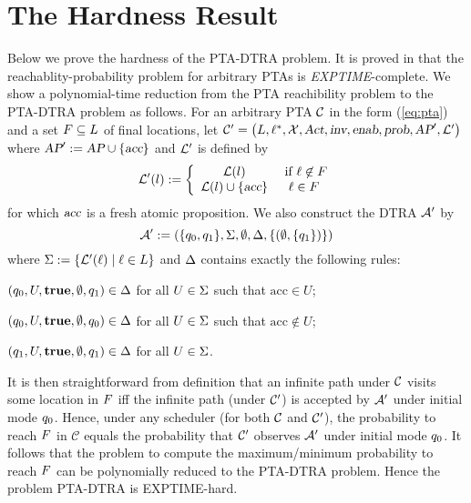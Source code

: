 \section{The Hardness Result}\label{app:hardness}

Below we prove the hardness of the PTA-DTRA problem. It is proved in \cite{LaroussinieS07} that the reachablity-probability problem for arbitrary PTAs is \emph{EXPTIME}-complete.
We show a polynomial-time reduction from the PTA reachibility problem to the PTA-DTRA problem as follows.
For an arbitrary PTA $\mathcal{C}$ in the form (\ref{eq:pta})
and a set $F\subseteq L$ of final locations,
let $\mathcal{C}'=\left(L, \ell^*, \mathcal{X}, \mbox{\sl Act}, \mbox{\sl inv}, \mbox{\sl enab},  \mbox{\sl prob}, \mbox{\sl AP}',\mathcal{L}'\right)$ where $\mbox{\sl AP}':=\mbox{\sl AP}\cup\{\mbox{\sl acc}\}$ and
$\mathcal{L}'$ is defined by
\begin{displaymath}
    \mathcal{L}'(l):=\left\{
    \begin{array}{cc}
        \mathcal{L}(l) & \mbox{ if } \ell\not\in F\\
        \mathcal{L}(l)\cup\{\mbox{\sl acc}\} & \ell\in F
    \end{array}
    \right.
\end{displaymath}
for which $\mbox{\sl acc}$ is a fresh atomic proposition.
We also construct the DTRA $\mathcal{A}'$ by
\[
\mathcal{A}':=\left(\{q_0,q_1\},\Sigma,\emptyset,\Delta,\{(\emptyset, \{q_1\})\}\right)
\]
where $\Sigma:=\{\mathcal{L}'(\ell)\mid \ell\in L\}$ and $\Delta$ contains exactly the following rules:
\begin{compactitem}
    \item  $(q_0,U,\mathbf{true}, \emptyset,q_1)\in\Delta$ for all $U\in\Sigma$ such that $\mbox{acc}\in U$;
    \item  $(q_0,U,\mathbf{true}, \emptyset,q_0)\in\Delta$ for all $U\in\Sigma$ such that $\mbox{acc}\not\in U$;
    \item $(q_1,U,\mathbf{true}, \emptyset,q_1)\in\Delta$ for all $U\in\Sigma$.
\end{compactitem}
It is then straightforward from definition that an infinite path under $\mathcal{C}$ visits some location in $F$ iff the infinite path (under $\mathcal{C}'$) is accepted by $\mathcal{A}'$ under initial mode $q_0$.
Hence, under any scheduler (for both $\mathcal{C}$ and $\mathcal{C}'$), the probability to reach $F$ in $\mathcal{C}$ equals the probability that
$\mathcal{C}'$ observes $\mathcal{A}'$ under initial mode $q_0$.
It follows that the problem to compute the maximum/minimum probability to reach $F$ can be polynomially reduced to the PTA-DTRA problem.
Hence the problem PTA-DTRA is EXPTIME-hard.







